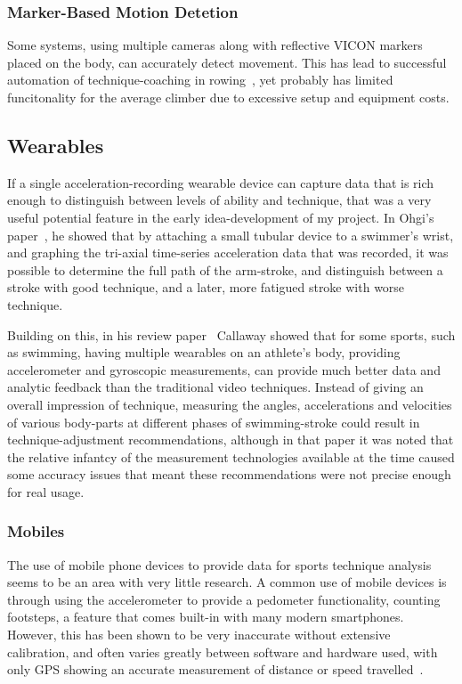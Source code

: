 \subsubsection{Marker-Based Motion Detetion}
Some systems, using multiple cameras along with reflective VICON markers placed on the body, can accurately detect movement.
This has lead to successful automation of technique-coaching in rowing~\cite{automaticrowingcoach}, yet probably has limited funcitonality for the average climber due to excessive setup and equipment costs.

\subsection{Wearables}
If a single acceleration-recording wearable device can capture data that is rich enough to distinguish between levels of ability and technique, that was a very useful potential feature in the early idea-development of my project.
In Ohgi's paper~\cite{oghiswim}, he showed that by attaching a small tubular device to a swimmer's wrist, and graphing the tri-axial time-series acceleration data that was recorded, it was possible to determine the full path of the arm-stroke, and distinguish between a stroke with good technique, and a later, more fatigued stroke with worse technique.

Building on this, in his review paper~\cite{callawayvideoacccomp} Callaway showed that for some sports, such as swimming, having multiple wearables on an athlete's body, providing accelerometer and gyroscopic measurements, can provide much better data and analytic feedback than the traditional video techniques.
Instead of giving an overall impression of technique, measuring the angles, accelerations and velocities of various body-parts at different phases of swimming-stroke could result in technique-adjustment recommendations, although in that paper it was noted that the relative infantcy of the measurement technologies available at the time caused some accuracy issues that meant these recommendations were not precise enough for real usage.

\subsubsection{Mobiles}
The use of mobile phone devices to provide data for sports technique analysis seems to be an area with very little research.
A common use of mobile devices is through using the accelerometer to provide a pedometer functionality, counting footsteps, a feature that comes built-in with many modern smartphones.
However, this has been shown to be very inaccurate without extensive calibration, and often varies greatly between software and hardware used, with only GPS showing an accurate measurement of distance or speed travelled~\cite{pedometer}.

